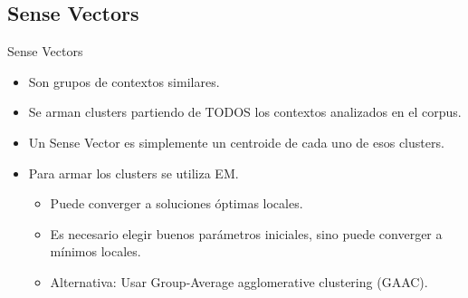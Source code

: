 \documentclass[xcolor=x11names,compress]{beamer}
\renewcommand{\(}{\begin{columns}}
\renewcommand{\)}{\end{columns}}
\newcommand{\<}[1]{\begin{column}{#1}}
\renewcommand{\>}{\end{column}}
\begin{document}
\subsection{Sense Vectors}
\begin{frame}{Sense Vectors}
\begin{itemize}
\item Son grupos de contextos similares.
\item Se arman clusters partiendo de TODOS los contextos analizados en el corpus.
\item Un Sense Vector es simplemente un centroide de cada uno de esos clusters.
\item Para armar los clusters se utiliza EM.
\begin{itemize}
\item Puede converger a soluciones óptimas locales.
\item Es necesario elegir buenos parámetros iniciales, sino puede converger a mínimos locales.
\item Alternativa: Usar Group-Average agglomerative clustering (GAAC).
\end{itemize}
\end{itemize}
\end{frame}
\end{document}
